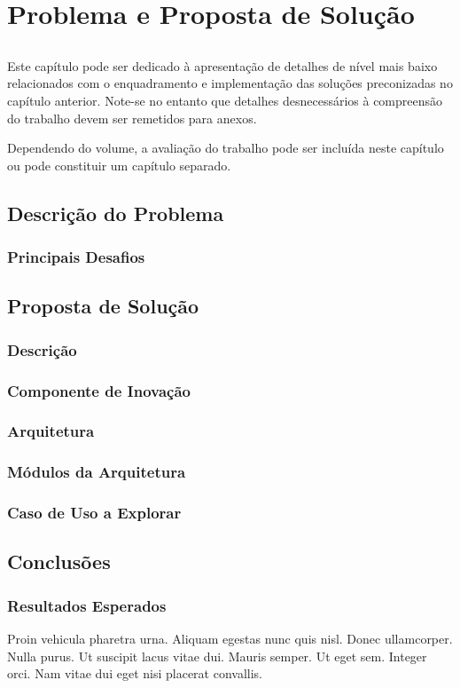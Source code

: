\chapter{Problema e Proposta de Solução}\label{chap:chap4}

\section*{}

Este capítulo pode ser dedicado à apresentação de detalhes de nível
mais baixo relacionados com o enquadramento e implementação das
soluções preconizadas no capítulo anterior.
Note-se no entanto que detalhes desnecessários à compreensão do
trabalho devem ser remetidos para anexos.

Dependendo do volume, a avaliação do trabalho pode ser incluída neste
capítulo ou pode constituir um capítulo separado.

\section{Descrição do Problema}

\subsection{Principais Desafios}

\section{Proposta de Solução}

\subsection{Descrição}

\subsection{Componente de Inovação}

\subsection{Arquitetura}

\subsection{Módulos da Arquitetura}

\subsection{Caso de Uso a Explorar}

\section{Conclusões}

\subsection{Resultados Esperados}

Proin vehicula pharetra urna. Aliquam egestas
nunc quis nisl. Donec ullamcorper. Nulla purus. Ut suscipit lacus
vitae dui. Mauris semper. Ut eget sem. Integer orci. Nam vitae dui
eget nisi placerat convallis. 
